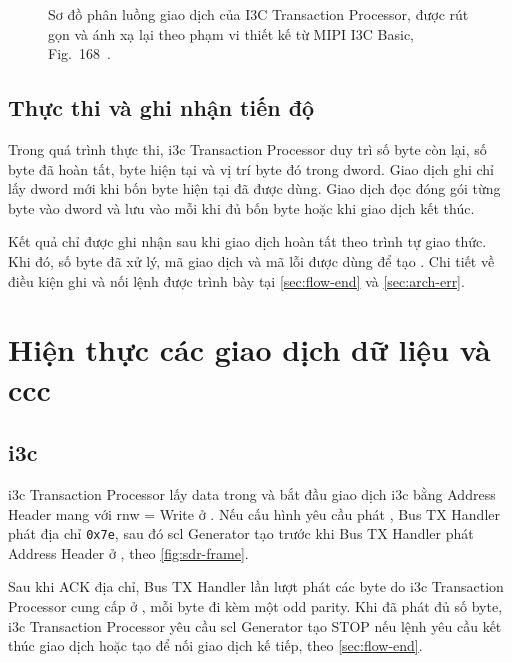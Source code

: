 \begin{figure}[!htbp]
	\centering
	\resizebox{\textwidth}{!}{}
	\caption[Sơ đồ phân luồng giao dịch của I3C Transaction Processor]{Sơ đồ phân luồng giao dịch của I3C Transaction Processor, được rút gọn và ánh xạ lại theo phạm vi thiết kế từ MIPI I3C Basic, Fig.~168~\cite{mipi_i3c_basic}.}
	\label{fig:primary-controller-flow}
\end{figure}

\subsection{Thực thi và ghi nhận tiến độ}
\label{sec:flow-merge}

Trong quá trình thực thi, \gls{i3c} Transaction Processor duy trì số byte còn lại, số byte đã hoàn tất,
byte hiện tại và vị trí byte đó trong \gls{dword}. Giao dịch ghi chỉ lấy \gls{dword} mới khi bốn
byte hiện tại đã được dùng. Giao dịch đọc đóng gói từng byte vào \gls{dword} và lưu vào \RxFifo{}
mỗi khi đủ bốn byte hoặc khi giao dịch kết thúc.

Kết quả chỉ được ghi nhận sau khi giao dịch hoàn tất theo trình tự giao thức. Khi đó, số byte đã xử lý, mã giao dịch và mã lỗi được dùng để tạo \ResponseDescriptor{}. Chi tiết về điều kiện ghi \ResponseDescriptor{} và nối lệnh được trình bày tại \cref{sec:flow-end} và \cref{sec:arch-err}.

\section{Hiện thực các giao dịch dữ liệu và \texorpdfstring{\gls{ccc}}{CCC}}

\subsection{\texorpdfstring{\gls{i3c}}{I3C} \PrivateWrite{}}

\gls{i3c} Transaction Processor lấy data trong \TxFifo{} và bắt đầu giao dịch \gls{i3c} \PrivateWrite{} bằng Address Header mang \DynamicAddress{} với \gls{rnw} = Write ở \OpenDrain{}. Nếu cấu hình yêu cầu phát \IThreeCBroadcastAddress{}, Bus TX Handler phát địa chỉ \texttt{0x7e}, sau đó \gls{scl} Generator tạo \RepeatedSTART{} trước khi Bus TX Handler phát Address Header ở \PushPull{}, theo \cref{fig:sdr-frame}.

Sau khi \Target{} ACK địa chỉ, Bus TX Handler lần lượt phát các byte do \gls{i3c} Transaction Processor cung cấp ở \PushPull{}, mỗi byte đi kèm một \TBit{} odd parity. Khi đã phát đủ số byte, \gls{i3c} Transaction Processor yêu cầu \gls{scl} Generator tạo STOP nếu lệnh yêu cầu kết thúc giao dịch hoặc tạo \RepeatedSTART{} để nối giao dịch kế tiếp, theo \cref{sec:flow-end}.

